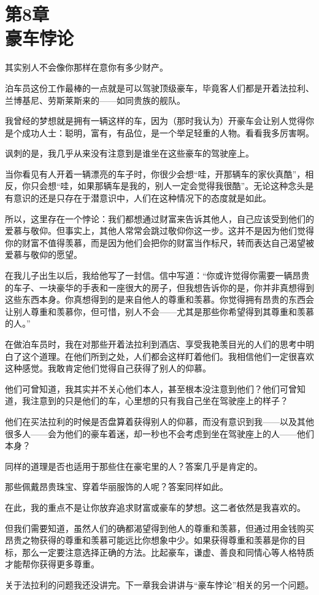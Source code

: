 
\section[第8章\q 豪车悖论]{第8章\\ 豪车悖论}

{\kaishu

其实别人不会像你那样在意你有多少财产。

}

泊车员这份工作最棒的一点就是可以驾驶顶级豪车，毕竟客人们都是开着法拉利、兰博基尼、劳斯莱斯来的——如同贵族的舰队。

我曾经的梦想就是拥有一辆这样的车，因为（那时我认为）开豪车会让别人觉得你是个成功人士：聪明，富有，有品位，是一个举足轻重的人物。看看我多厉害啊。

讽刺的是，我几乎从来没有注意到是谁坐在这些豪车的驾驶座上。

当你看见有人开着一辆漂亮的车子时，你很少会想“哇，开那辆车的家伙真酷”，相反，你只会想“哇，如果那辆车是我的，别人一定会觉得我很酷”。无论这种念头是有意识的还是只存在于潜意识中，人们在这种情况下的态度就是如此。

所以，这里存在一个悖论：我们都想通过财富来告诉其他人，自己应该受到他们的爱慕与敬仰。但事实上，其他人常常会跳过敬仰你这一步。这并不是因为他们觉得你的财富不值得羡慕，而是因为他们会把你的财富当作标尺，转而表达自己渴望被爱慕与敬仰的愿望。

在我儿子出生以后，我给他写了一封信。信中写道：“你或许觉得你需要一辆昂贵的车子、一块豪华的手表和一座很大的房子，但我想告诉你的是，你并非真想得到这些东西本身。你真想得到的是来自他人的尊重和羡慕。你觉得拥有昂贵的东西会让别人尊重和羡慕你，但可惜，别人不会——尤其是那些你希望得到其尊重和羡慕的人。”

在做泊车员时，我在对那些开着法拉利到酒店、享受我艳羡目光的人们的思考中明白了这个道理。在他们所到之处，人们都会这样盯着他们。我相信他们一定很喜欢这种感觉。我敢肯定他们觉得自己获得了别人的仰慕。

他们可曾知道，我其实并不关心他们本人，甚至根本没注意到他们？他们可曾知道，我注意到的只是他们的车，心里想的只有我自己坐在驾驶座上的样子？

他们在买法拉利的时候是否盘算着获得别人的仰慕，而没有意识到我——以及其他很多人——会为他们的豪车着迷，却一秒也不会考虑到坐在驾驶座上的人——他们本身？

同样的道理是否也适用于那些住在豪宅里的人？答案几乎是肯定的。

那些佩戴昂贵珠宝、穿着华丽服饰的人呢？答案同样如此。

在此，我的重点不是让你放弃追求财富或豪车的梦想。这二者依然是我喜欢的。

但我们需要知道，虽然人们的确都渴望得到他人的尊重和羡慕，但通过用金钱购买昂贵之物获得的尊重和羡慕可能远比你想象中少。如果获得尊重和羡慕是你的目标，那么一定要注意选择正确的方法。比起豪车，谦虚、善良和同情心等人格特质才能帮你获得更多尊重。

关于法拉利的问题我还没讲完。下一章我会讲讲与“豪车悖论”相关的另一个问题。
